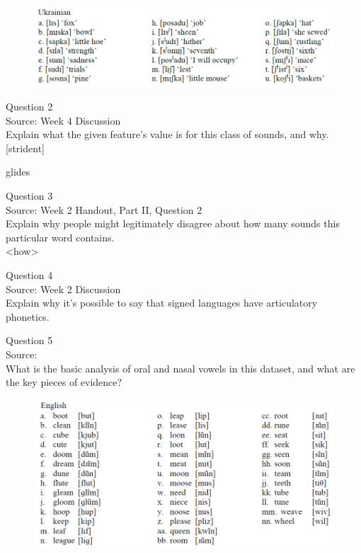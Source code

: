 \documentclass[12pt]{article}
\begin{document}
\begin{figure}[H]
\includegraphics{../images/ukrainian.png}
\end{figure}

\newpage

{\large Question 2}\\

Source: Week 4 Discussion\\

Explain what the given feature’s value is for this class of sounds, and why.\\

{[strident]}

glides


\newpage

{\large Question 3}\\

Source: Week 2 Handout, Part II, Question 2\\

Explain why people might legitimately disagree about how many sounds this particular word contains.\\

<how>


\newpage

{\large Question 4}\\

Source: Week 2 Discussion\\

Explain why it's possible to say that signed languages have articulatory phonetics.\\


\newpage

{\large Question 5}\\

Source: \\

What is the basic analysis of oral and nasal vowels in this dataset, and what are the key pieces of evidence?\\

\begin{figure}[H]
\includegraphics{../images/english12.png}
\end{figure}

\newpage

\begin{center}
\textbf{{\color{red}{\HUGE END OF EXAM}}}\\

\end{center}
\newpage
\end{document}
